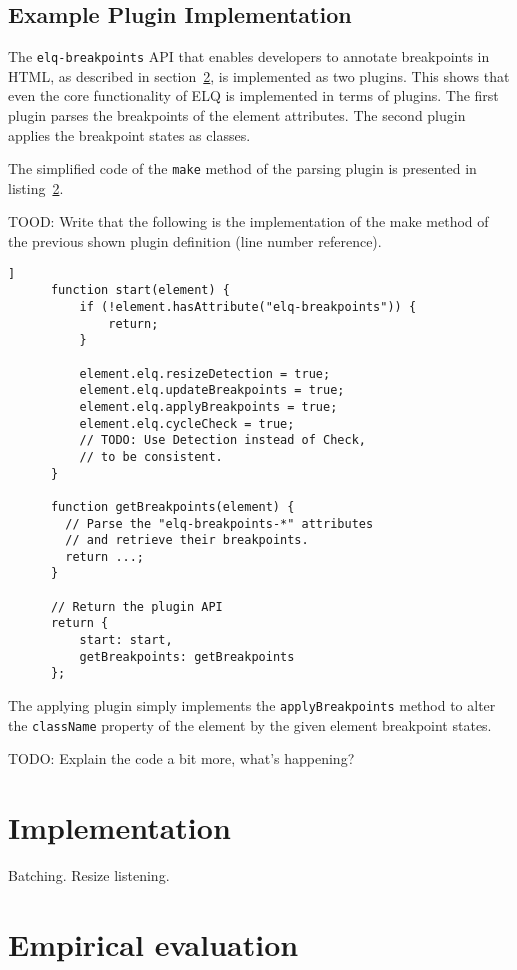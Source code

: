 \documentclass{acm_proc_article-sp}
\newcommand{\code}[1]{\texttt{#1}}
\newcommand{\elq}{ELQ}
\begin{document}
  \subsection{Example Plugin Implementation}
    The \code{elq-breakpoints} API that enables developers to annotate breakpoints in HTML, as described in section~\ref{}, is implemented as two plugins.
    This shows that even the core functionality of \elq{} is implemented in terms of plugins.
    The first plugin parses the breakpoints of the element attributes.
    The second plugin applies the breakpoint states as classes.

    The simplified code of the \code{make} method of the parsing plugin is presented in listing~\ref{}.

    TOOD: Write that the following is the implementation of the make method of the previous shown plugin definition (line number reference).

    \begin{lstlisting}[gobble=6,caption={},captionpos=b,label={}]]
      function start(element) {
          if (!element.hasAttribute("elq-breakpoints")) {
              return;
          }

          element.elq.resizeDetection = true;
          element.elq.updateBreakpoints = true;
          element.elq.applyBreakpoints = true;
          element.elq.cycleCheck = true;
          // TODO: Use Detection instead of Check, 
          // to be consistent.
      }

      function getBreakpoints(element) {
        // Parse the "elq-breakpoints-*" attributes
        // and retrieve their breakpoints.
        return ...;
      }

      // Return the plugin API
      return {
          start: start,
          getBreakpoints: getBreakpoints
      };
    \end{lstlisting}

    The applying plugin simply implements the \code{applyBreakpoints} method to alter the \code{className} property of the element by the given element breakpoint states.

    TODO: Explain the code a bit more, what's happening?


\section{Implementation}
  Batching.
  Resize listening.

\section{Empirical evaluation}
\end{document}
